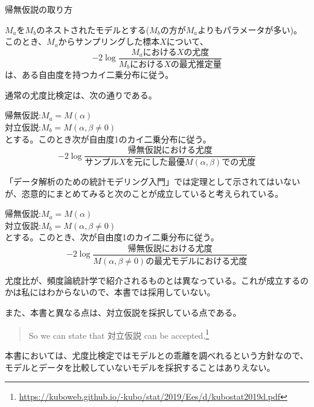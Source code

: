 \begin{SMbox}{帰無仮説の取り方}
    \begin{theorem}
        $M_a$を$M_b$のネストされたモデルとする($M_b$の方が$M_a$よりもパラメータが多い)。このとき、$M_a$からサンプリングした標本$X$について、
        \begin{equation*}
            -2\log\frac{M_aにおけるXの尤度}{M_bにおけるXの最尤推定量}
        \end{equation*}
        は、ある自由度を持つカイ二乗分布に従う。
    \end{theorem}
\fi

    通常の尤度比検定は、次の通りである。
    \begin{theo}
        帰無仮説:$M_a=M(\alpha)$\\
        対立仮説:$M_b=M(\alpha,\beta\neq 0)$\\
        とする。このとき次が自由度1のカイ二乗分布に従う。
        \begin{equation*}
            -2\log\frac{帰無仮説における尤度}{サンプルXを元にした最優M(\alpha,\beta)での尤度}
        \end{equation*}
    \end{theo}

    「データ解析のための統計モデリング入門」では定理として示されてはいないが、恣意的にまとめてみると次のことが成立していると考えられている。
    \begin{theo}
        帰無仮説:$M_a=M(\alpha)$\\
        対立仮説:$M_b=M(\alpha,\beta\neq 0)$\\
        とする。このとき、次が自由度1のカイ二乗分布に従う。
        \begin{equation*}
            -2\log\frac{帰無仮説における尤度}{M(\alpha,\beta\neq 0)の最尤モデルにおける尤度}
        \end{equation*}
    \end{theo}
    尤度比が、頻度論統計学で紹介されるものとは異なっている。これが成立するのかは私にはわからないので、本書では採用していない。

    また、本書と異なる点は、対立仮説を採択している点である。
    \begin{quote}
        So we can state that 対立仮説 can be accepted.\footnote{\url{https://kuboweb.github.io/-kubo/stat/2019/Ees/d/kubostat2019d.pdf}}
    \end{quote}

    本書においては、尤度比検定ではモデルとの乖離を調べれるという方針なので、モデルとデータを比較していないモデルを採択することはありえない。    
\end{SMbox}




